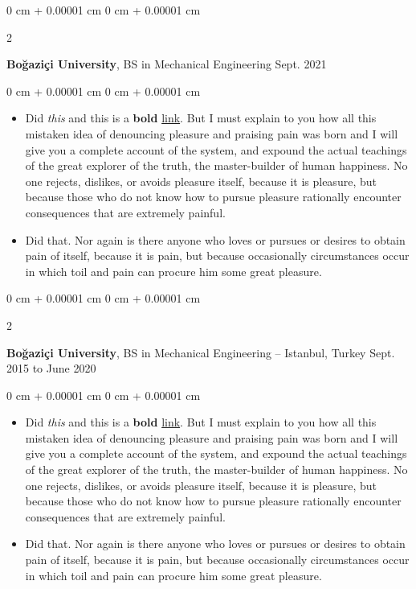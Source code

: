 \documentclass[10pt, letterpaper]{article}
\newenvironment{highlights}{
    \begin{itemize}[
        topsep=0.10 cm,
        parsep=0.10 cm,
        partopsep=0pt,
        itemsep=0pt,
        leftmargin=0 cm + 10pt
    ]
}{
    \end{itemize}
} %
\newenvironment{onecolentry}{
    \begin{adjustwidth}{
        0 cm + 0.00001 cm
    }{
        0 cm + 0.00001 cm
    }
}{
    \end{adjustwidth}
} %
\newenvironment{twocolentry}[2][]{
    \onecolentry
    \def\secondColumn{#2}
    \setcolumnwidth{\fill, 4.5 cm}
    \begin{paracol}{2}
}{
    \switchcolumn \raggedleft \secondColumn
    \end{paracol}
    \endonecolentry
} %
\begin{document}
        \vspace{0.2 cm}

        \begin{twocolentry}{
            Sept. 2021
        }
            \textbf{Boğaziçi University}, BS in Mechanical Engineering\end{twocolentry}

        \vspace{0.10 cm}
        \begin{onecolentry}
            \begin{highlights}
                \item Did \textit{this} and this is a \textbf{bold} \href{https://example.com}{link}. But I must explain to you how all this mistaken idea of denouncing pleasure and praising pain was born and I will give you a complete account of the system, and expound the actual teachings of the great explorer of the truth, the master-builder of human happiness. No one rejects, dislikes, or avoids pleasure itself, because it is pleasure, but because those who do not know how to pursue pleasure rationally encounter consequences that are extremely painful.
                \item Did that. Nor again is there anyone who loves or pursues or desires to obtain pain of itself, because it is pain, but because occasionally circumstances occur in which toil and pain can procure him some great pleasure.
            \end{highlights}
        \end{onecolentry}


        \vspace{0.2 cm}

        \begin{twocolentry}{
            Sept. 2015 to June 2020
        }
            \textbf{Boğaziçi University}, BS in Mechanical Engineering -- Istanbul, Turkey\end{twocolentry}

        \vspace{0.10 cm}
        \begin{onecolentry}
            \begin{highlights}
                \item Did \textit{this} and this is a \textbf{bold} \href{https://example.com}{link}. But I must explain to you how all this mistaken idea of denouncing pleasure and praising pain was born and I will give you a complete account of the system, and expound the actual teachings of the great explorer of the truth, the master-builder of human happiness. No one rejects, dislikes, or avoids pleasure itself, because it is pleasure, but because those who do not know how to pursue pleasure rationally encounter consequences that are extremely painful.
                \item Did that. Nor again is there anyone who loves or pursues or desires to obtain pain of itself, because it is pain, but because occasionally circumstances occur in which toil and pain can procure him some great pleasure.
            \end{highlights}
        \end{onecolentry}
\end{document}
